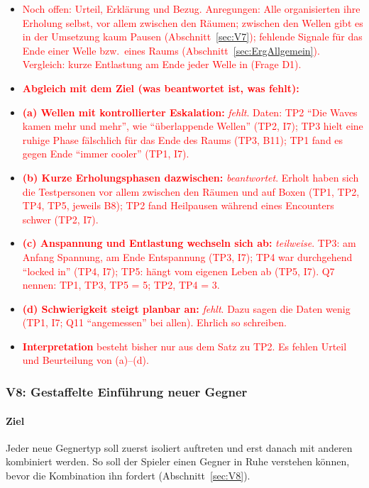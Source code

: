 \documentclass[../Main.tex]{subfiles}
\begin{document}
\begin{itemize}[leftmargin=1.5cm]
    \item \textcolor{red}{Noch offen: Urteil, Erklärung und Bezug. Anregungen: Alle organisierten ihre Erholung selbst, vor allem zwischen den Räumen; zwischen den Wellen gibt es in der Umsetzung kaum Pausen (Abschnitt~\ref{sec:V7}); fehlende Signale für das Ende einer Welle bzw.\ eines Raums (Abschnitt~\ref{sec:ErgAllgemein}). Vergleich: kurze Entlastung am Ende jeder Welle in  (Frage D1).}
\end{itemize}

\begin{itemize}[leftmargin=1.5cm]
    \item \textcolor{red}{\textbf{Abgleich mit dem Ziel (was beantwortet ist, was fehlt):}}
    \item \textcolor{red}{\textbf{(a) Wellen mit kontrollierter Eskalation:} \emph{fehlt}. Daten: TP2 \enquote{Die Waves kamen mehr und mehr}, wie \enquote{überlappende Wellen} (TP2, I7); TP3 hielt eine ruhige Phase fälschlich für das Ende des Raums (TP3, B11); TP1 fand es gegen Ende \enquote{immer cooler} (TP1, I7).}
    \item \textcolor{red}{\textbf{(b) Kurze Erholungsphasen dazwischen:} \emph{beantwortet}. Erholt haben sich die Testpersonen vor allem zwischen den Räumen und auf Boxen (TP1, TP2, TP4, TP5, jeweils B8); TP2 fand Heilpausen während eines Encounters schwer (TP2, I7).}
    \item \textcolor{red}{\textbf{(c) Anspannung und Entlastung wechseln sich ab:} \emph{teilweise}. TP3: am Anfang Spannung, am Ende Entspannung (TP3, I7); TP4 war durchgehend \enquote{locked in} (TP4, I7); TP5: hängt vom eigenen Leben ab (TP5, I7). Q7 nennen: TP1, TP3, TP5 = 5; TP2, TP4 = 3.}
    \item \textcolor{red}{\textbf{(d) Schwierigkeit steigt planbar an:} \emph{fehlt}. Dazu sagen die Daten wenig (TP1, I7; Q11 \enquote{angemessen} bei allen). Ehrlich so schreiben.}
    \item \textcolor{red}{\textbf{Interpretation} besteht bisher nur aus dem Satz zu TP2. Es fehlen Urteil und Beurteilung von (a)--(d).}
\end{itemize}

\subsubsection{V8: Gestaffelte Einführung neuer Gegner}

\paragraph{Ziel}
Jeder neue Gegnertyp soll zuerst isoliert auftreten und erst danach mit anderen kombiniert werden. So soll der Spieler einen Gegner in Ruhe verstehen können, bevor die Kombination ihn fordert (Abschnitt~\ref{sec:V8}).
\end{document}
